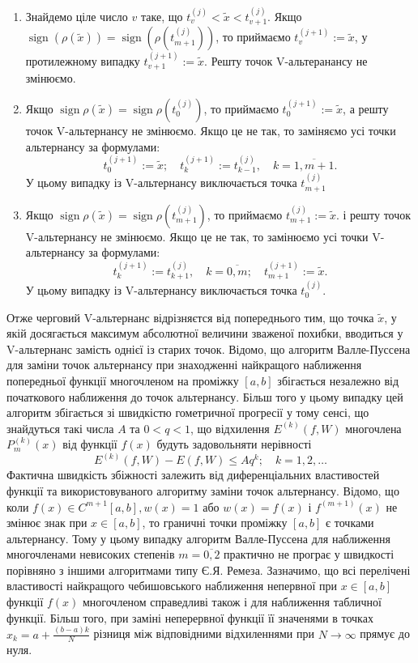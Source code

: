 \documentclass[ukrainian,14pt]{extarticle}
\newcommand{\sign}{\operatorname{sign}}
\begin{document}
	\begin{enumerate}
	\item Знайдемо ціле число $v$ таке, що $t^{(j)}_v < \tilde{x} < t^{(j)}_{v+1}$. Якщо $\sign(\rho(\tilde{x})) = \sign(\rho(t^{(j)}_{m+1}))$, то приймаємо $t^{(j+1)}_v := \tilde{x}$, у протилежному випадку $t^{(j+1)}_{v+1}:=\tilde{x}$. Решту точок V-альтеранансу не змінюємо.
	\item Якщо $\sign \rho(\tilde{x}) = \sign \rho(t^{(j)}_0)$, то приймаємо $t^{(j+1)}_0 := \tilde{x}$, а решту точок V-альтернансу не змінюємо. Якщо це не так, то заміняємо усі точки альтернансу за формулами:
	$$t^{(j+1)}_{0}:=\tilde{x};\quad t^{(j+1)}_k := t^{(j)}_{k-1}, \quad k=\overline{1, m+1}.$$
	У цьому випадку із V-альтернансу виключається точка $t^{(j)}_{m+1}$
	
	\item Якщо $\sign \rho(\tilde{x}) = \sign \rho(t^{(j)}_{m+1})$, то приймаємо $t^{(j)}_{m+1}:=\tilde{x}.$ і решту точок V-альтернансу не змінюємо. Якщо це не так, то замінюємо усі точки V-альтернансу за формулами:
	$$t^{(j+1)}_k := t^{(j)}_{k+1}, \quad k=\overline{0,m}; \quad t^{(j+1)}_{m+1}:=\tilde{x}.$$
	У цьому випадку із V-альтернансу виключається точка $t^{(j)}_0$.
	\end{enumerate}
	Отже черговий V-альтернанс відрізняєтся від попереднього тим, що точка $\tilde{x}$, у якій досягається максимум абсолютної величини зваженої похибки, вводиться у V-альтернанс замість однієї із старих точок.
	Відомо, що алгоритм Валле-Пуссена для заміни точок альтернансу при знаходженні найкращого наближення попередньої функції многочленом на проміжку $[a,b]$ збігається незалежно від початкового наближення до точок альтернансу. Більш того у цьому випадку цей алгоритм збігається зі швидкістю гометричної прогресії у тому сенсі, що знайдуться такі числа $A$ та $0 < q < 1$, що відхилення $E^{(k)}(f,W)$ многочлена $P^{(k)}_m(x)$ від функції $f(x)$ будуть задовольняти нерівності
	$$E^{(k)}(f,W) - E(f,W) \leq Aq^k; \quad k=1,2,\ldots$$
Фактична швидкість збіжності залежить від диференціальних властивостей функції та використовуваного алгоритму	 заміни точок альтернансу. Відомо, що коли $f(x) \in C^{m+1} [a,b], w(x) = 1$ або $w(x) = f(x)$ і $f^{(m+1)}(x)$ не змінює знак при $x \in [a,b]$, то граничні точки проміжку $[a,b]$ є точками альтернансу. Тому у цьому випадку алгоритм Валле-Пуссена для наближення многочленами невисоких степенів $m = \overline{0, 2}$ практично не програє у швидкості порівняно з іншими алгоритмами типу Є.Я. Ремеза.
Зазначимо, що всі перелічені властивості найкращого чебишовського наближення непервної при $x \in [a,b]$ функції $f(x)$ многочленом справедливі також і для наближення табличної функції. Більш того, при заміні неперервної функції її значенями в точках $x_k = a + \frac{(b-a)k}{N}$ різниця між відповідними відхиленнями при $N\rightarrow\infty$ прямує до нуля.
\end{document}
